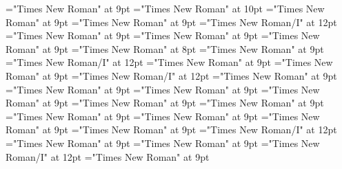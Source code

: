 \documentclass[gps1,twoside]{article}
\begin{document}
\font\sensenumbersensecontentsensessensesensesentryafter="Times New Roman" at 9pt
\font\sensesensessensesensesentry="Times New Roman" at 10pt
\font\sensetypesensesensessensesensesentrybefore="Times New Roman" at 9pt
\font\sensetypesensesensessensesensesentryafter="Times New Roman" at 9pt
\font\sensetypesensesensessensesensesentry="Times New Roman/I" at 12pt
\font\abbreviationsensetypesensesensessensesensesentrybefore="Times New Roman" at 9pt
\font{}="Times New Roman" at 9pt
\font\spandefinitionorglosssensesensessensesensesentrylastchildafter="Times New Roman" at 9pt
\font\exampleexampleexamplessensesensessensesensesentrybefore="Times New Roman" at 8pt
\font\examplessensesensessensesensesentryafter="Times New Roman" at 9pt
\font\spanbzhexampleexampleexamplessensesensessensesensesentry="Times New Roman/I" at 12pt
\font\exampleexampleexamplessensesensessensesensesentrybefore="Times New Roman" at 9pt
\font\spanexampleexampleexamplessensesensessensesensesentrylastchildafter="Times New Roman" at 9pt
\font\spanexampleexampleexamplessensesensessensesensesentry="Times New Roman/I" at 12pt
\font\translationtranslationtranslationsexampleexamplessensesensessensesensesentrybefore="Times New Roman" at 9pt
\font\spantranslationtranslationtranslationsexampleexamplessensesensessensesensesentrylastchildafter="Times New Roman" at 9pt
\font\encyclopedicinfosensesensessensesensesentrybefore="Times New Roman" at 9pt
\font\spanencyclopedicinfosensesensessensesensesentryfirstchildbefore="Times New Roman" at 9pt
\font\spanencyclopedicinfosensesensessensesensesentrylastchildafter="Times New Roman" at 9pt
\font\restrictionssensesensessensesensesentrybefore="Times New Roman" at 9pt
\font\spanrestrictionssensesensessensesensesentryfirstchildbefore="Times New Roman" at 9pt
\font\spanrestrictionssensesensessensesensesentrylastchildafter="Times New Roman" at 9pt
\font\lexsensereferencessensesensessensesensesentrybefore="Times New Roman" at 9pt
\font\lexsensereferencessensesensessensesensesentryafter="Times New Roman" at 9pt
\font\spanenownertypeabbreviationlexsensereferencelexsensereferencessensesensessensesensesentry="Times New Roman/I" at 12pt
\font\ownertypeabbreviationlexsensereferencelexsensereferencessensesensessensesensesentrybefore="Times New Roman" at 9pt
\font\spanownertypeabbreviationlexsensereferencelexsensereferencessensesensessensesensesentrylastchildafter="Times New Roman" at 9pt
\font\spanownertypeabbreviationlexsensereferencelexsensereferencessensesensessensesensesentry="Times New Roman/I" at 12pt
\font\configtargetconfigtargetconfigtargetslexsensereferencelexsensereferencessensesensessensesensesentrybefore="Times New Roman" at 9pt
\end{document}
